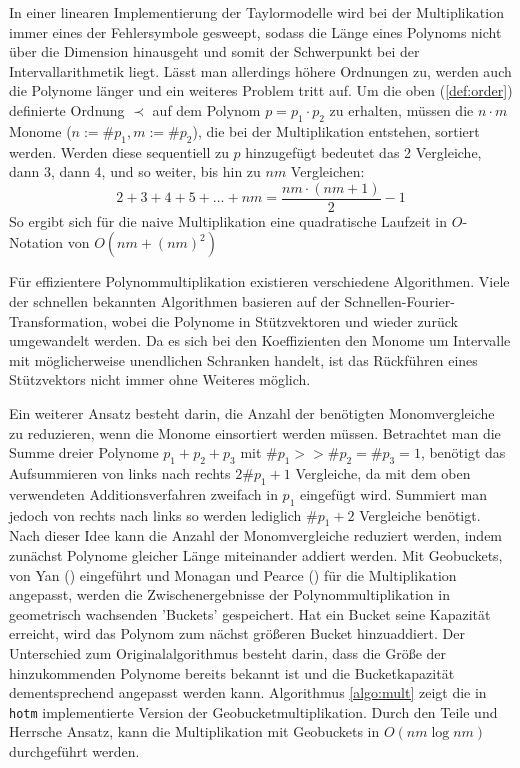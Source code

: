 In einer linearen Implementierung der Taylormodelle wird bei der Multiplikation immer eines der Fehlersymbole gesweept, sodass die Länge eines Polynoms nicht über die Dimension hinausgeht und somit der Schwerpunkt bei der Intervallarithmetik liegt. Lässt man allerdings höhere Ordnungen zu, werden auch die Polynome länger und ein weiteres Problem tritt auf. Um die oben (\ref{def:order}) definierte Ordnung $\prec$ auf dem Polynom $p = p_1 \cdot p_2$ zu erhalten, müssen die $n\cdot m$ Monome ($n := \#p_1, m := \#p_2$), die bei der Multiplikation entstehen, sortiert werden. Werden diese sequentiell zu $p$ hinzugefügt bedeutet das 2 Vergleiche, dann 3, dann 4, und so weiter, bis hin zu $nm$ Vergleichen:
$$ 2 + 3 + 4 + 5 + ... + nm = \frac{nm \cdot (nm + 1)}{2} - 1$$
So ergibt sich für die naive Multiplikation eine quadratische Laufzeit in $O$-Notation von $O(nm + (nm)^2)$
\par
Für effizientere Polynommultiplikation existieren verschiedene Algorithmen. Viele der schnellen bekannten Algorithmen basieren  auf der Schnellen-Fourier-Transformation, wobei die Polynome in Stützvektoren und wieder zurück umgewandelt werden. Da es sich bei den Koeffizienten den Monome um Intervalle mit möglicherweise unendlichen Schranken handelt, ist das Rückführen eines Stützvektors nicht immer ohne Weiteres möglich. \par
Ein weiterer Ansatz besteht darin, die Anzahl der benötigten Monomvergleiche zu reduzieren, wenn die Monome einsortiert werden müssen. Betrachtet man die Summe dreier Polynome $p_1 + p_2 + p_3$ mit $\#p_1 >> \#p_2 = \#p_3 = 1$, benötigt das Aufsummieren von links nach rechts $2\#p_1 + 1$ Vergleiche, da mit dem oben verwendeten Additionsverfahren zweifach in $p_1$ eingefügt wird. Summiert man jedoch von rechts nach links so werden lediglich $\#p_1 + 2$ Vergleiche benötigt. Nach dieser Idee kann die Anzahl der Monomvergleiche reduziert werden, indem zunächst Polynome gleicher Länge miteinander addiert werden. Mit Geobuckets, von Yan (\cite{geobuckets}) eingeführt und Monagan und Pearce (\cite{geobucketsmulti}) für die Multiplikation angepasst, werden die Zwischenergebnisse der Polynommultiplikation in geometrisch wachsenden 'Buckets' gespeichert. Hat ein Bucket seine Kapazität erreicht, wird das Polynom zum nächst größeren Bucket hinzuaddiert. Der Unterschied zum Originalalgorithmus besteht darin, dass die Größe der hinzukommenden Polynome bereits bekannt ist und die Bucketkapazität dementsprechend angepasst werden kann. Algorithmus \ref{algo:mult} zeigt die in \verb+hotm+ implementierte Version der Geobucketmultiplikation. Durch den Teile und Herrsche Ansatz, kann die Multiplikation mit Geobuckets in $O(nm \log nm)$ durchgeführt werden.  \par


